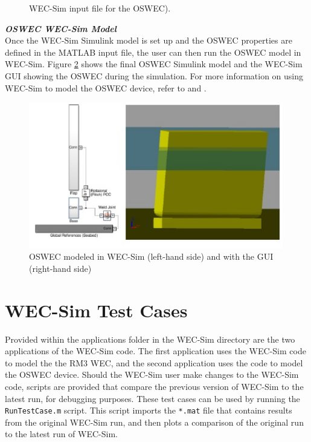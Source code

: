 \begin{figure}[H]
\centering

\caption{WEC-Sim input file for the OSWEC).}
\label{fig:OSWECinputFile}
\end{figure}

\textbf{\textit{OSWEC WEC-Sim Model}}\\
Once the WEC-Sim Simulink model is set up and the OSWEC properties are defined in the MATLAB input file, the user can then run the OSWEC model in WEC-Sim.  Figure \ref{OSWEC_WECSim_GUI} shows the final OSWEC Simulink model and the WEC-Sim GUI showing the OSWEC during the simulation. For more information on using WEC-Sim to model the OSWEC device, refer to \cite{y._yu_development_2014} and \cite{y._yu_design_2014}.

        \begin{figure}[!h]
        \centering
        \includegraphics[width=0.99\textwidth]{application/images/OSWEC_WECSim_GUI}
        \caption{OSWEC modeled in WEC-Sim (left-hand side) and with the GUI (right-hand side)}
        \label{OSWEC_WECSim_GUI}
        \end{figure}

\section{WEC-Sim Test Cases}
Provided within the applications folder in the WEC-Sim directory are the two applications of the WEC-Sim code. The first application uses the WEC-Sim code to model the the RM3 WEC, and the second application uses the code to model the OSWEC device. Should the WEC-Sim user make changes to the WEC-Sim code, scripts are provided that compare the previous version of WEC-Sim to the latest run, for debugging purposes.  These test cases can be used by running the \texttt{RunTestCase.m} script.  This script imports the \texttt{*.mat} file that contains results from the original WEC-Sim run, and then plots a comparison of the original run to the latest run of WEC-Sim.  

